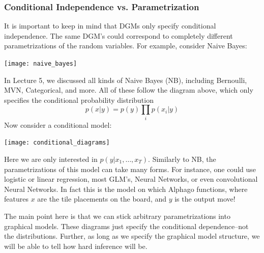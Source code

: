 \documentclass{article}
\begin{document}
\subsubsection{Conditional Independence vs. Parametrization}
It is important to keep in mind that DGMs only specify conditional independence. The same DGM's could correspond to completely different parametrizations of the random variables. For example, consider Naive Bayes:
\begin{center}
\texttt{[image: naive\_bayes]}
\end{center}
In Lecture 5, we discussed all kinds of Naive Bayes (NB), including Bernoulli, MVN, Categorical, and more. All of these follow the diagram above, which only specifies the conditional probability distribution
\[
p(x|y)=p(y)\prod\limits_i p(x_i|y)
\]
Now consider a conditional model:
\begin{center}
\texttt{[image: conditional\_diagrams]}
\end{center}
Here we are only interested in $p(y|x_1,\ldots,x_T)$. Similarly to NB, the parametrizations of this model can take many forms. For instance, one could use logistic or linear regression, most GLM's, Neural Networks, or even convolutional Neural Networks. In fact this is the model on which Alphago functions, where features $x$ are the tile placements on the board, and $y$ is the output move!

The main point here is that we can stick arbitrary parametrizations into graphical models. These diagrams just specify the conditional dependence--not the distributions. Further, as long as we specify the graphical model structure, we will be able to tell how hard inference will be.
\end{document}
